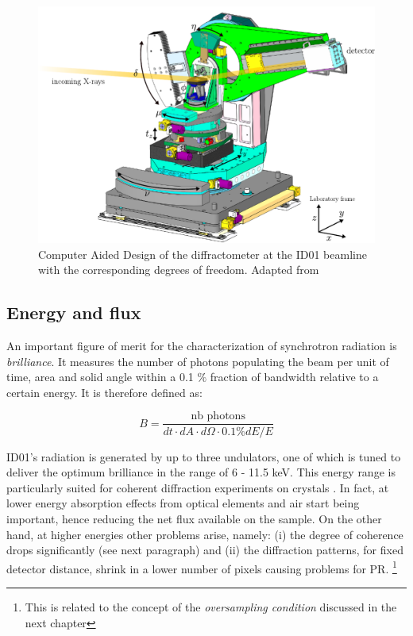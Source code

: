 \begin{figure}[H]
    \centering
    \includegraphics[width=\textwidth]{figures/Intro/beamline.pdf}
    \caption{Computer Aided Design of the diffractometer at the ID01 beamline with the corresponding degrees of freedom. 
    Adapted from \cite{Atlan2023}}
    \label{fig:diffractometer}
\end{figure}

\subsection{Energy and flux}
An important figure of merit for the characterization of synchrotron radiation is \textit{brilliance}. It measures 
the number of photons populating the beam per unit of time, area and solid angle within a 0.1 $\%$ fraction of bandwidth relative 
to a certain energy. 
It is therefore defined as:

\begin{equation}
    B = \frac{\text{nb photons}}{dt \cdot dA \cdot d\Omega \cdot 0.1\% dE/E} 
\end{equation} 
 
ID01's radiation is generated by up to three undulators, one of which is tuned to deliver the optimum brilliance 
in the range of 6 - 11.5 keV. This energy range is particularly suited for coherent diffraction experiments on crystals . 
In fact, at lower energy absorption effects from optical elements and air start being important, hence reducing the net 
flux available on the sample. On the other hand, at higher energies other problems arise, namely: (i) the degree of  
coherence drops significantly (see next paragraph) and (ii) the diffraction patterns, for fixed detector distance, shrink 
in a lower number of pixels causing problems for PR. \footnote[1]{ 
This is related to the concept of the \textit{oversampling condition} discussed in the next chapter}

